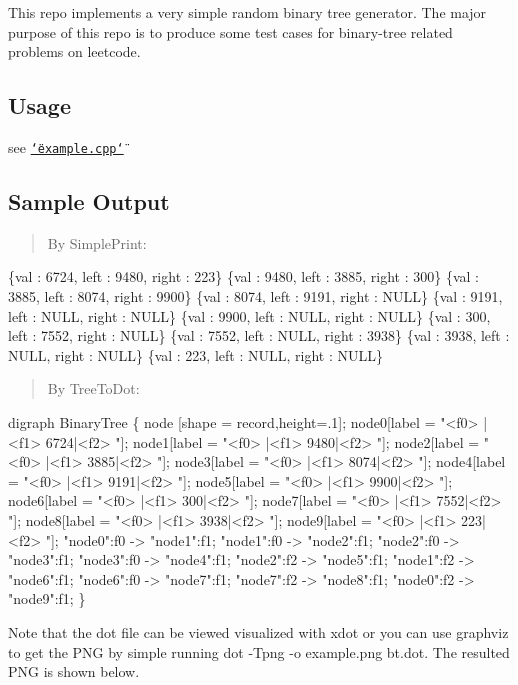 \href{https://travis-ci.org/saber-dragon/RandomBinaryTreeGenerator}{\tt }

This repo implements a very simple random binary tree generator. The major purpose of this repo is to produce some test cases for binary-\/tree related problems on leetcode.

\subsection*{Usage}

see \href{./example.cpp}{\tt \char`\"{}example.\+cpp\char`\"{}}

\subsection*{Sample Output}

\begin{quote}
By {\ttfamily Simple\+Print}\+: \end{quote}

\begin{DoxyCode}
\{val : 6724, left : 9480, right : 223\}
\{val : 9480, left : 3885, right : 300\}
\{val : 3885, left : 8074, right : 9900\}
\{val : 8074, left : 9191, right : NULL\}
\{val : 9191, left : NULL, right : NULL\}
\{val : 9900, left : NULL, right : NULL\}
\{val : 300, left : 7552, right : NULL\}
\{val : 7552, left : NULL, right : 3938\}
\{val : 3938, left : NULL, right : NULL\}
\{val : 223, left : NULL, right : NULL\}
\end{DoxyCode}


\begin{quote}
By {\ttfamily Tree\+To\+Dot}\+: \end{quote}



\begin{DoxyCode}
digraph BinaryTree \{
node [shape = record,height=.1];
 node0[label = "<f0> |<f1> 6724|<f2> "];
 node1[label = "<f0> |<f1> 9480|<f2> "];
 node2[label = "<f0> |<f1> 3885|<f2> "];
 node3[label = "<f0> |<f1> 8074|<f2> "];
 node4[label = "<f0> |<f1> 9191|<f2> "];
 node5[label = "<f0> |<f1> 9900|<f2> "];
 node6[label = "<f0> |<f1> 300|<f2> "];
 node7[label = "<f0> |<f1> 7552|<f2> "];
 node8[label = "<f0> |<f1> 3938|<f2> "];
 node9[label = "<f0> |<f1> 223|<f2> "];
"node0":f0 -> "node1":f1;
"node1":f0 -> "node2":f1;
"node2":f0 -> "node3":f1;
"node3":f0 -> "node4":f1;
"node2":f2 -> "node5":f1;
"node1":f2 -> "node6":f1;
"node6":f0 -> "node7":f1;
"node7":f2 -> "node8":f1;
"node0":f2 -> "node9":f1;
\}
\end{DoxyCode}
 Note that the dot file can be viewed visualized with {\ttfamily xdot} or you can use {\ttfamily graphviz} to get the P\+NG by simple running {\ttfamily dot -\/\+Tpng -\/o example.\+png bt.\+dot}. The resulted P\+NG is shown below.

 